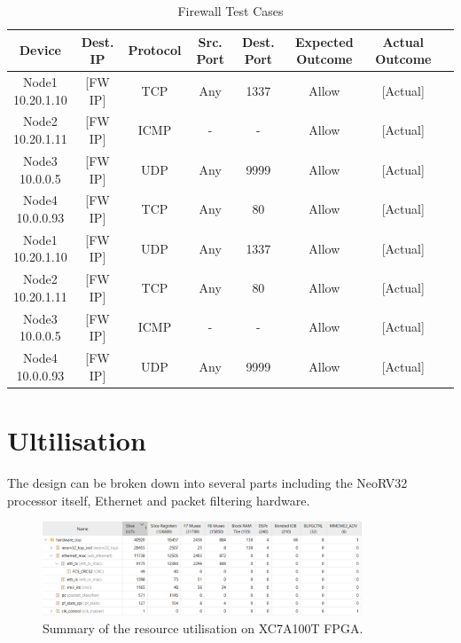 \begin{table}[h]
    \centering
    \begin{tabular}{cccccccc}
        \toprule
        Device & Dest. IP & Protocol & Src. Port & Dest. Port & Expected Outcome & Actual Outcome \\
        \midrule
        \parbox[c]{2.5cm}{\centering Node1\\10.20.1.10} & [FW IP] & TCP & Any & 1337 & Allow & [Actual] \\
        \parbox[c]{2.5cm}{\centering Node2\\10.20.1.11} & [FW IP] & ICMP & - & - & Allow & [Actual] \\
        \parbox[c]{2cm}{\centering Node3\\10.0.0.5} & [FW IP] & UDP & Any & 9999 & Allow & [Actual] \\
        \parbox[c]{2cm}{\centering Node4\\10.0.0.93} & [FW IP] & TCP & Any & 80 & Allow & [Actual] \\
        \parbox[c]{2cm}{\centering Node1\\10.20.1.10} & [FW IP] & UDP & Any & 1337 & Allow & [Actual] \\
        \parbox[c]{2cm}{\centering Node2\\10.20.1.11} & [FW IP] & TCP & Any & 80 & Allow & [Actual] \\
        \parbox[c]{2cm}{\centering Node3\\10.0.0.5} & [FW IP] & ICMP & - & - & Allow & [Actual] \\
        \parbox[c]{2cm}{\centering Node4\\10.0.0.93} & [FW IP] & UDP & Any & 9999 & Allow & [Actual] \\
        \bottomrule
    \end{tabular}
    \caption{Firewall Test Cases}
    \label{tab:firewall_test_cases}
\end{table}

\section{Ultilisation}

The design can be broken down into several parts including the NeoRV32 processor itself, Ethernet and packet filtering hardware.

\begin{figure}[h]
    \centering
    \includegraphics[width=0.85\textwidth]{Images/FPGAUtilisationResources.png}
    \caption[Summary of the resource utilisation on XC7A100T FPGA]{Summary of the resource utilisation on XC7A100T FPGA.}
    \label{fig:eye_diagram}
\end{figure}


